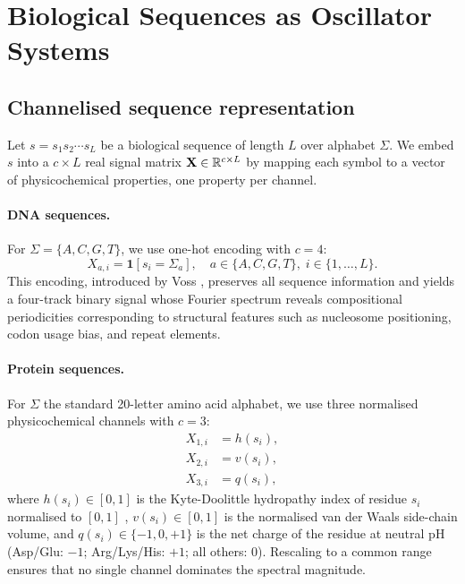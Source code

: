 \section{Biological Sequences as Oscillator Systems}
\label{im:sec:oscillator}

\subsection{Channelised sequence representation}
\label{im:sec:channelisation}

Let $s = s_1 s_2 \cdots s_L$ be a biological sequence of length $L$ over
alphabet $\Sigma$. We embed $s$ into a $c \times L$ real signal matrix
$\mathbf{X} \in \mathbb{R}^{c \times L}$ by mapping each symbol to a vector of
physicochemical properties, one property per channel.

\paragraph{DNA sequences.}
For $\Sigma = \{A, C, G, T\}$, we use one-hot encoding with $c = 4$:
\begin{equation}
  X_{a,i} = \mathbf{1}[s_i = \Sigma_a], \quad a \in \{A,C,G,T\},\;
  i \in \{1,\ldots,L\}.
  \label{im:eq:onehot}
\end{equation}
This encoding, introduced by Voss \citep{voss1992}, preserves all sequence
information and yields a four-track binary signal whose Fourier spectrum
reveals compositional periodicities corresponding to structural features such
as nucleosome positioning, codon usage bias, and repeat elements.

\paragraph{Protein sequences.}
For $\Sigma$ the standard 20-letter amino acid alphabet, we use three
normalised physicochemical channels with $c = 3$:
\begin{align}
  X_{1,i} &= h(s_i), \label{im:eq:hydropathy}\\
  X_{2,i} &= v(s_i), \label{im:eq:volume}\\
  X_{3,i} &= q(s_i), \label{im:eq:charge}
\end{align}
where $h(s_i) \in [0,1]$ is the Kyte-Doolittle hydropathy index of residue
$s_i$ normalised to $[0,1]$ \citep{kyte1982}, $v(s_i) \in [0,1]$ is the
normalised van der Waals side-chain volume, and $q(s_i) \in \{-1,0,+1\}$ is
the net charge of the residue at neutral pH (Asp/Glu: $-1$; Arg/Lys/His: $+1$;
all others: $0$). Rescaling to a common range ensures that no single channel
dominates the spectral magnitude.

